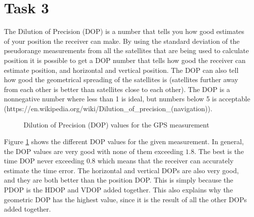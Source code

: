 \documentclass{article}
\begin{document}
\section*{Task 3}
The Dilution of Precision (DOP) is a number that tells you how good estimates of your position the receiver can make. By using the standard deviation of the pseudorange measurements from all the satellites that are being used to calculate position it is possible to get a DOP number that tells how good the receiver can estimate position, and horizontal and vertical position. The DOP can also tell how good the geometrical spreading of the satellites is (satellites further away from each other is better than satellites close to each other). The DOP is a nonnegative number where less than 1 is ideal, but numbers below 5 is acceptable (https://en.wikipedia.org/wiki/Dilution\_of\_precision\_(navigation)).

\begin{figure}[!ht]
    \centering
    \caption{Dilution of Precision (DOP) values for the GPS measurement}
    \label{fig:dop}
\end{figure}

Figure \ref{fig:dop} shows the different DOP values for the given measurement. In general, the DOP values are very good with none of them exceeding $1.8$. The best is the time DOP never exceeding $0.8$ which means that the receiver can accurately estimate the time error. The horizontal and vertical DOPs are also very good, and they are both better than the position DOP. This is simply because the PDOP is the HDOP and VDOP added together. This also explains why the geometric DOP has the highest value, since it is the result of all the other DOPs added together.
\end{document}
